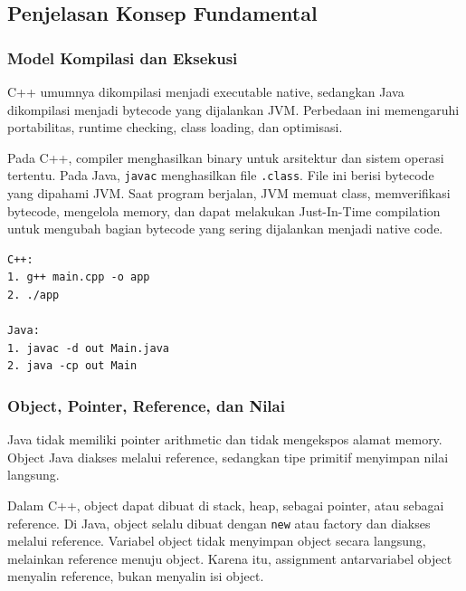 \subsection{Penjelasan Konsep Fundamental}

\subsubsection{Model Kompilasi dan Eksekusi}

\begin{jawab}
C++ umumnya dikompilasi menjadi executable native, sedangkan Java dikompilasi menjadi bytecode yang dijalankan JVM. Perbedaan ini memengaruhi portabilitas, runtime checking, class loading, dan optimisasi.
\end{jawab}

Pada C++, compiler menghasilkan binary untuk arsitektur dan sistem operasi tertentu. Pada Java, \texttt{javac} menghasilkan file \texttt{.class}. File ini berisi bytecode yang dipahami JVM. Saat program berjalan, JVM memuat class, memverifikasi bytecode, mengelola memory, dan dapat melakukan Just-In-Time compilation untuk mengubah bagian bytecode yang sering dijalankan menjadi native code.

\begin{lstlisting}[caption={Perbandingan alur build sederhana}, label={lst:java-cpp-build}]
C++:
1. g++ main.cpp -o app
2. ./app

Java:
1. javac -d out Main.java
2. java -cp out Main
\end{lstlisting}

\subsubsection{Object, Pointer, Reference, dan Nilai}

\begin{jawab}
Java tidak memiliki pointer arithmetic dan tidak mengekspos alamat memory. Object Java diakses melalui reference, sedangkan tipe primitif menyimpan nilai langsung.
\end{jawab}

Dalam C++, object dapat dibuat di stack, heap, sebagai pointer, atau sebagai reference. Di Java, object selalu dibuat dengan \texttt{new} atau factory dan diakses melalui reference. Variabel object tidak menyimpan object secara langsung, melainkan reference menuju object. Karena itu, assignment antarvariabel object menyalin reference, bukan menyalin isi object.

